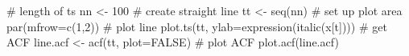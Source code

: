 \begin{Schunk}
\begin{Sinput}
 # length of ts
 nn <- 100
 # create straight line
 tt <- seq(nn)
 # set up plot area
 par(mfrow=c(1,2))
 # plot line
 plot.ts(tt, ylab=expression(italic(x[t])))
 # get ACF
 line.acf <- acf(tt, plot=FALSE)
 # plot ACF
 plot.acf(line.acf)
\end{Sinput}
\end{Schunk}
